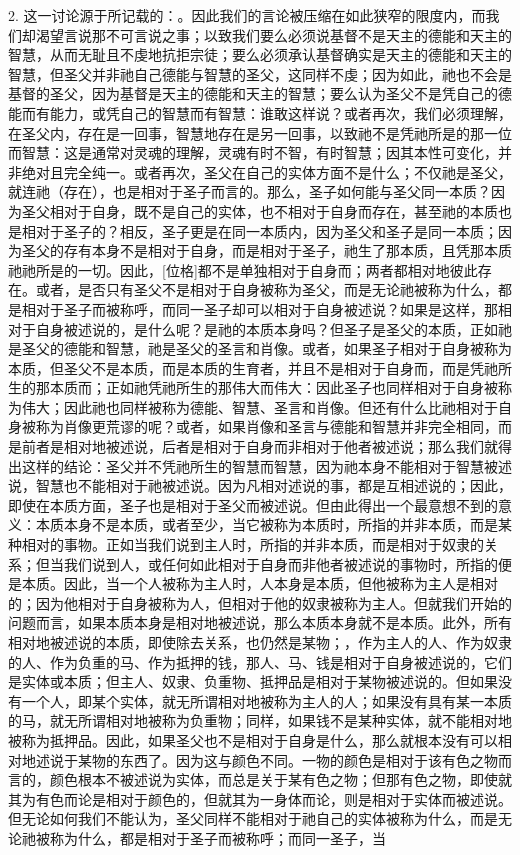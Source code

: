 2. 这一讨论源于所记载的：。因此我们的言论被压缩在如此狭窄的限度内，而我们却渴望言说那不可言说之事；以致我们要么必须说基督不是天主的德能和天主的智慧，从而无耻且不虔地抗拒宗徒；要么必须承认基督确实是天主的德能和天主的智慧，但圣父并非祂自己德能与智慧的圣父，这同样不虔；因为如此，祂也不会是基督的圣父，因为基督是天主的德能和天主的智慧；要么认为圣父不是凭自己的德能而有能力，或凭自己的智慧而有智慧：谁敢这样说？或者再次，我们必须理解，在圣父内，存在是一回事，智慧地存在是另一回事，以致祂不是凭祂所是的那一位而智慧：这是通常对灵魂的理解，灵魂有时不智，有时智慧；因其本性可变化，并非绝对且完全纯一。或者再次，圣父在自己的实体方面不是什么；不仅祂是圣父，就连祂（存在），也是相对于圣子而言的。那么，圣子如何能与圣父同一本质？因为圣父相对于自身，既不是自己的实体，也不相对于自身而存在，甚至祂的本质也是相对于圣子的？相反，圣子更是在同一本质内，因为圣父和圣子是同一本质；因为圣父的存有本身不是相对于自身，而是相对于圣子，祂生了那本质，且凭那本质祂祂所是的一切。因此，[位格]都不是单独相对于自身而；两者都相对地彼此存在。或者，是否只有圣父不是相对于自身被称为圣父，而是无论祂被称为什么，都是相对于圣子而被称呼，而同一圣子却可以相对于自身被述说？如果是这样，那相对于自身被述说的，是什么呢？是祂的本质本身吗？但圣子是圣父的本质，正如祂是圣父的德能和智慧，祂是圣父的圣言和肖像。或者，如果圣子相对于自身被称为本质，但圣父不是本质，而是本质的生育者，并且不是相对于自身而，而是凭祂所生的那本质而；正如祂凭祂所生的那伟大而伟大：因此圣子也同样相对于自身被称为伟大；因此祂也同样被称为德能、智慧、圣言和肖像。但还有什么比祂相对于自身被称为肖像更荒谬的呢？或者，如果肖像和圣言与德能和智慧并非完全相同，而是前者是相对地被述说，后者是相对于自身而非相对于他者被述说；那么我们就得出这样的结论：圣父并不凭祂所生的智慧而智慧，因为祂本身不能相对于智慧被述说，智慧也不能相对于祂被述说。因为凡相对述说的事，都是互相述说的；因此，即使在本质方面，圣子也是相对于圣父而被述说。但由此得出一个最意想不到的意义：本质本身不是本质，或者至少，当它被称为本质时，所指的并非本质，而是某种相对的事物。正如当我们说到主人时，所指的并非本质，而是相对于奴隶的关系；但当我们说到人，或任何如此相对于自身而非他者被述说的事物时，所指的便是本质。因此，当一个人被称为主人时，人本身是本质，但他被称为主人是相对的；因为他相对于自身被称为人，但相对于他的奴隶被称为主人。但就我们开始的问题而言，如果本质本身是相对地被述说，那么本质本身就不是本质。此外，所有相对地被述说的本质，即使除去关系，也仍然是某物；，作为主人的人、作为奴隶的人、作为负重的马、作为抵押的钱，那人、马、钱是相对于自身被述说的，它们是实体或本质；但主人、奴隶、负重物、抵押品是相对于某物被述说的。但如果没有一个人，即某个实体，就无所谓相对地被称为主人的人；如果没有具有某一本质的马，就无所谓相对地被称为负重物；同样，如果钱不是某种实体，就不能相对地被称为抵押品。因此，如果圣父也不是相对于自身是什么，那么就根本没有可以相对地述说于某物的东西了。因为这与颜色不同。一物的颜色是相对于该有色之物而言的，颜色根本不被述说为实体，而总是关于某有色之物；但那有色之物，即使就其为有色而论是相对于颜色的，但就其为一身体而论，则是相对于实体而被述说。但无论如何我们不能认为，圣父同样不能相对于祂自己的实体被称为什么，而是无论祂被称为什么，都是相对于圣子而被称呼；而同一圣子，当